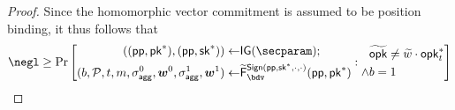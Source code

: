 \begin{proof}
  Since the homomorphic vector commitment is assumed to be position binding, it thus follows that
  \begin{equation}
    \negl \geq \Pr\left[\begin{aligned}((\params,\pk^*),(\params,\sk^*)) \gets& \IG(\secparam);\\ (b,\pubkeys,t,m,\aggsig^0,\vec{w}^0,\aggsig^1,\vec{w}^1)\gets& \widetilde\fork^{\sign(\params,\sk^*,\cdot,\cdot)}_\bdv(\params,\pk^*)\end{aligned} :\begin{aligned} &\widetilde\opk \neq \widetilde w \cdot \opk^*_{t} \\ \land& b=1\end{aligned}\right]\label{opkstardifferentisnegl}
  \end{equation}
  

\end{proof}

